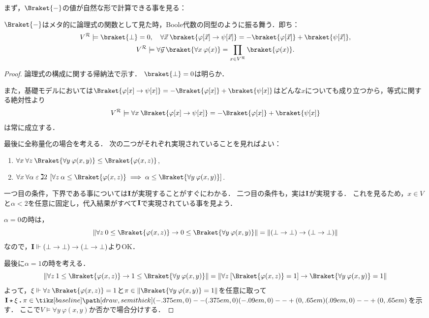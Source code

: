 \documentclass[realisability.tex]{subfiles}
\begin{document}
まず，$\Braket{ - }$の値が自然な形で計算できる事を見る：
\begin{lemma}\label{lem:char-homo}
 $\Braket{ - }$はメタ的に論理式の関数として見た時，Boole代数の同型のように振る舞う．即ち：
 \begin{gather*}
  V^{\mathcal{R}} \models \braket{\bot} = 0, \quad \forall \vec{x}\: \braket{\varphi[\vec{x}] \to \psi[\vec{x}]} = - \braket{\varphi[\vec{x}]} + \braket{\psi[\vec{x}]},\\
  V^{\mathcal{R}} \models \forall \vec{y} \: \braket{\forall x \: \varphi(x)} = \prod_{x \in V^{\mathcal{R}}} \braket{\varphi(x)}.
 \end{gather*}
\end{lemma}
\begin{proof}
 論理式の構成に関する帰納法で示す．
 $\braket{\bot} = 0$は明らか．

 また，基礎モデルにおいては$\Braket{ \varphi[x] \to \psi[x] } = -\Braket{\varphi[x]} + \braket{\psi[x]}$はどんな$x$についても成り立つから，等式に関する絶対性より
 \[
  V^{\mathcal{R}} \models \forall x \: \Braket{ \varphi[x] \to \psi[x] } = -\Braket{\varphi[x]} + \braket{\psi[x]}
 \]
 は常に成立する．

 最後に全称量化の場合を考える．
 次の二つがそれぞれ実現されていることを見ればよい：
 \begin{enumerate}
  \item $\forall x \: \forall z \: \Braket{\forall y \: \varphi(x, y) } \leq \Braket{\varphi(x, z)}$,
  \item $\forall x \: \forall \alpha \strin \gimel 2\:
          \left[\forall z \: \alpha \leq \Braket{\varphi(x, z)}
            \implies \alpha \leq \Braket{\forall y \: \varphi(x,y)}
          \right]$.
 \end{enumerate}
 一つ目の条件，下界である事については$\mathsf{\mathbf{I}}$が実現することがすぐにわかる．
 二つ目の条件も，実は$\mathsf{\mathbf{I}}$が実現する．
 これを見るため，$x \in V$と$\alpha < 2$を任意に固定し，代入結果がすべて$\mathsf{\mathbf{I}}$で実現されている事を見よう．

 $\alpha = 0$の時は，
 \[
  \|\forall z \: 0 \leq \Braket{\varphi(x, z)}
 \to 0 \leq \Braket{\forall y \: \varphi(x,y)}\| = \|(\bot \to \bot) \to (\bot \to \bot)\|
 \]
 なので，$\mathsf{\mathbf{I}} \Vdash (\bot \to \bot) \to (\bot \to \bot)$よりOK．

 最後に$\alpha = 1$の時を考える．
 \[
  \|\forall z \: 1 \leq \Braket{\varphi(x, z)}
 \to 1 \leq \Braket{\forall y \: \varphi(x,y)}\| =
 \|\forall z \:[\Braket{\varphi(x, z)} = 1]
 \to \Braket{\forall y \: \varphi(x,y)} = 1\|
 \]
 よって，$\xi \Vdash \forall z \: \Braket{\varphi(x,z)} = 1$と$\pi \in \|\Braket{\forall y \: \varphi(x,y)} = 1\|$を任意に取って$\comb{I} \cons \xi \push \pi \in \pole$を示す．
 ここで$V \models \forall y \: \varphi(x,y)$か否かで場合分けする．


\end{proof}
\end{document}
